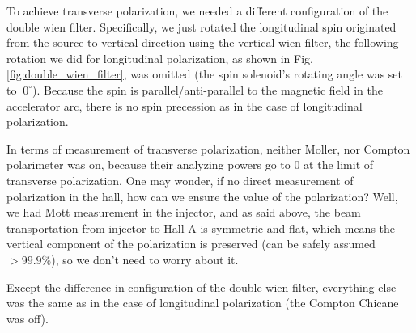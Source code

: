 To achieve transverse polarization, we needed a different configuration of the
double wien filter. Specifically, we just rotated the longitudinal spin originated
from the source to vertical direction using the vertical wien filter, the 
following rotation we did for longitudinal polarization, as shown in 
Fig. \ref{fig:double_wien_filter}, was omitted (the spin solenoid's rotating
angle was set to $~0^\circ$). Because the spin is parallel/anti-parallel
to the magnetic field in the accelerator arc, there is no spin precession as in
the case of longitudinal polarization. 

In terms of measurement of transverse polarization, neither Moller, nor Compton
polarimeter was on, because their analyzing powers go to 0 at the limit of transverse
polarization. One may wonder, if no direct measurement of polarization in the 
hall, how can we ensure the value of the polarization? Well, we had Mott measurement
in the injector, and as said above, the beam transportation from injector to Hall A
is symmetric and flat, which means the vertical component of the polarization
is preserved (can be safely assumed $>99.9\%$), so we don't need to worry about it.

Except the difference in configuration of the double wien filter, everything 
else was the same as in the case of longitudinal polarization (the Compton Chicane
was off). 

